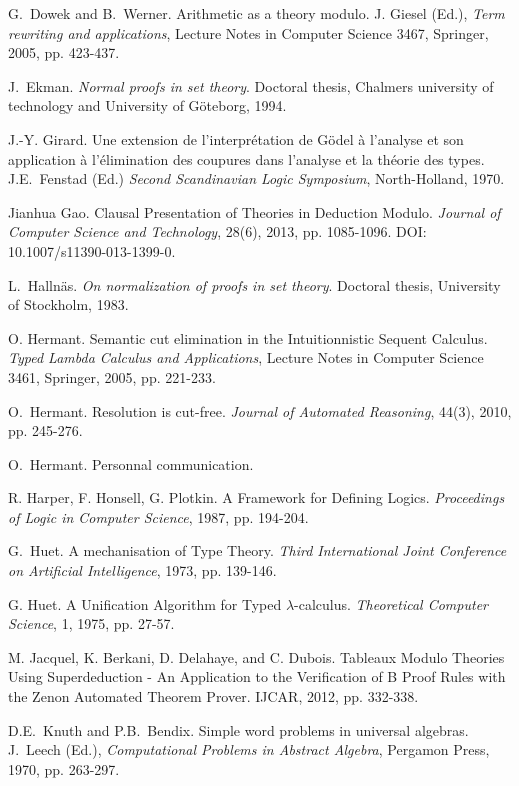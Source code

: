 \documentclass{llncs}
\begin{document}
\begin{thebibliography}{99.}
G.~Dowek and B.~Werner. 
Arithmetic as a theory modulo. 
J. Giesel (Ed.), {\em Term rewriting and applications}, 
Lecture Notes in Computer Science 3467, Springer, 2005, pp. 423-437. 

J.~Ekman.
{\em Normal proofs in set theory}. 
Doctoral thesis, Chalmers university of technology and University 
of G\"{o}teborg, 1994.

J.-Y. Girard.
Une extension de l'interpr\'etation de G\"odel \`a
l'analyse et son application \`a l'\'elimination des coupures dans
l'analyse et la th\'eorie des types.
J.E.~Fenstad (Ed.)  {\em Second Scandinavian Logic Symposium}, 
North-Holland, 1970.

Jianhua Gao.
Clausal Presentation of Theories in Deduction Modulo.
{\em Journal of Computer Science and Technology}, 28(6), 
2013, pp. 1085-1096. DOI: 10.1007/s11390-013-1399-0. 

L.~Halln\"{a}s.
{\em On normalization of proofs in set theory}.
Doctoral thesis, University of Stockholm, 1983.

O. Hermant.
Semantic cut elimination in the Intuitionnistic Sequent Calculus.
{\em Typed Lambda Calculus and Applications}, 
Lecture Notes in Computer Science 3461, Springer, 2005, pp. 221-233.

O.~Hermant.
Resolution is cut-free.
{\em Journal of Automated Reasoning}, 44(3), 2010, pp. 245-276.

O.~Hermant. Personnal communication.

R. Harper, F. Honsell, G. Plotkin.
A Framework for Defining Logics.
{\it Proceedings of Logic in Computer Science}, 1987, pp. 194-204.

G.~Huet.
A mechanisation of Type Theory.
{\em Third International Joint Conference on Artificial Intelligence}, 
1973,  pp. 139-146.

G. Huet.
A Unification Algorithm for Typed $\lambda$-calculus.
{\em Theoretical Computer Science}, 1, 1975, pp. 27-57.

M. Jacquel, K. Berkani, D. Delahaye, and C. Dubois.
Tableaux Modulo Theories Using Superdeduction - An Application to the 
Verification of B Proof Rules with the Zenon Automated Theorem Prover.
IJCAR, 2012, pp. 332-338.

D.E.~Knuth and P.B.~Bendix.
Simple word problems in universal algebras.
J.~Leech (Ed.), {\em Computational Problems in Abstract
Algebra}, Pergamon Press, 1970, pp. 263-297. 


\end{thebibliography}
\end{document}
